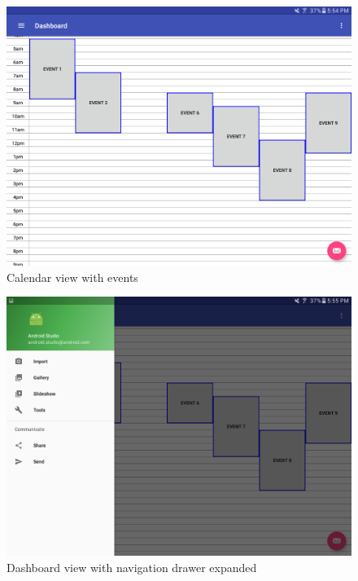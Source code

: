 \begin{figure}
\includegraphics[scale=0.45]{calendarview.png}
\caption{Calendar view with events}
\label{fig:calendar}
\end{figure}

\begin{figure}
\includegraphics[scale=0.45]
{navigation.png}
\caption{Dashboard view with navigation drawer expanded}
\label{fig:nav}
\end{figure}

